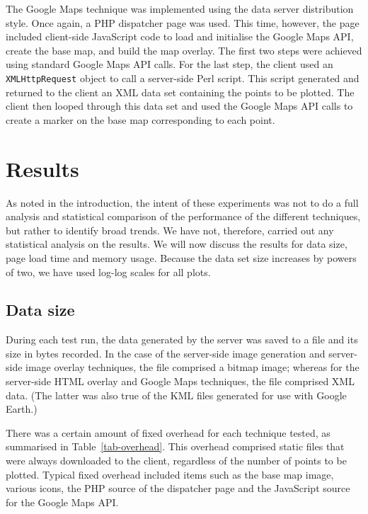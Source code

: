 \documentclass[acmtocl,acmnow]{acmtrans2m}
\begin{document}
The Google Maps technique was implemented using the data server
distribution style. Once again, a PHP dispatcher page was used. This
time, however, the page included client-side JavaScript code to load and
initialise the Google Maps API, create the base map, and build the map
overlay. The first two steps were achieved using standard Google Maps
API calls. For the last step, the client used an \texttt{XMLHttpRequest}
object to call a server-side Perl script. This script generated and
returned to the client an XML data set containing the points to be
plotted. The client then looped through this data set and used the
Google Maps API calls to create a marker on the base map corresponding
to each point.


\section{Results}
\label{sec-results}

As noted in the introduction, the intent of these experiments was not to
do a full analysis and statistical comparison of the performance of the
different techniques, but rather to identify broad trends. We have not,
therefore, carried out any statistical analysis on the results. We will
now discuss the results for data size, page load time and memory usage.
Because the data set size increases by powers of two, we have used
log-log scales for all plots.


\subsection{Data size}

During each test run, the data generated by the server was saved to a
file and its size in bytes recorded. In the case of the server-side
image generation and server-side image overlay techniques, the file
comprised a bitmap image; whereas for the server-side HTML overlay and
Google Maps techniques, the file comprised XML data. (The latter was
also true of the KML files generated for use with Google Earth.)

There was a certain amount of fixed overhead for each technique tested,
as summarised in Table~\ref{tab-overhead}. This overhead comprised
static files that were always downloaded to the client, regardless of
the number of points to be plotted. Typical fixed overhead included
items such as the base map image, various icons, the PHP source of the
dispatcher page and the JavaScript source for the Google Maps API.
\end{document}

